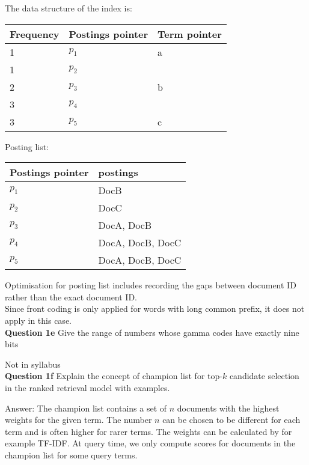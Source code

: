 \documentclass[11pt,a4paper]{report}
\begin{document}
\begin{multicols*}{2}
\noindent The data structure of the index is:

\begin{center}
\begin{tabular}{ | l | l | l |} 
    \hline
    Frequency & Postings pointer & Term pointer \\
    \hline
    1 & $p_1$ & a\\
    1 & $p_2$ & \\
    2 & $p_3$ & b\\
    3 & $p_4$ & \\
    3 & $p_5$ & c\\
    \hline
\end{tabular}
\end{center}

\noindent Posting list:
\begin{center}
\begin{tabular}{ | l | l |} 
    \hline
    Postings pointer & postings \\
    \hline
    $p_1$ & DocB\\
    $p_2$ & DocC\\
    $p_3$ & DocA, DocB\\
    $p_4$ & DocA, DocB, DocC\\
    $p_5$ & DocA, DocB, DocC\\
    \hline
\end{tabular}
\end{center}

\noindent Optimisation for posting list includes recording the gaps between document ID rather than the exact document ID.\\

\noindent Since front coding is only applied for words with long common prefix, it does not apply in this case.\\

\noindent \textbf{Question 1e} Give the range of numbers whose gamma codes have exactly nine bits

\noindent Not in syllabus \\

\noindent \textbf{Question 1f} Explain the concept of champion list for top-$k$ candidate selection in the ranked retrieval model with examples. 

\noindent Answer: The champion list contains a set of $n$ documents with the highest weights for the given term. The number $n$ can be chosen to be different for each term and is often higher for rarer terms. The weights can be calculated by for example TF-IDF. At query time, we only compute scores for documents in the champion list for some query terms.


\end{multicols*}
\end{document}

